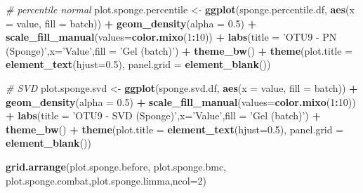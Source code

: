 \documentclass[]{book}
\newenvironment{Shaded}{\begin{snugshade}}{\end{snugshade}}
\newcommand{\KeywordTok}[1]{\textcolor[rgb]{0.13,0.29,0.53}{\textbf{#1}}}
\newcommand{\DataTypeTok}[1]{\textcolor[rgb]{0.13,0.29,0.53}{#1}}
\newcommand{\DecValTok}[1]{\textcolor[rgb]{0.00,0.00,0.81}{#1}}
\newcommand{\FloatTok}[1]{\textcolor[rgb]{0.00,0.00,0.81}{#1}}
\newcommand{\StringTok}[1]{\textcolor[rgb]{0.31,0.60,0.02}{#1}}
\newcommand{\CommentTok}[1]{\textcolor[rgb]{0.56,0.35,0.01}{\textit{#1}}}
\newcommand{\OperatorTok}[1]{\textcolor[rgb]{0.81,0.36,0.00}{\textbf{#1}}}
\newcommand{\NormalTok}[1]{#1}
\begin{document}
\begin{Shaded}
\begin{Highlighting}[]
\CommentTok{# percentile normal}
\NormalTok{plot.sponge.percentile <-}\StringTok{ }\KeywordTok{ggplot}\NormalTok{(sponge.percentile.df, }\KeywordTok{aes}\NormalTok{(}\DataTypeTok{x =}\NormalTok{ value, }\DataTypeTok{fill =}\NormalTok{ batch)) }\OperatorTok{+}\StringTok{ }\KeywordTok{geom_density}\NormalTok{(}\DataTypeTok{alpha =} \FloatTok{0.5}\NormalTok{) }\OperatorTok{+}\StringTok{ }\KeywordTok{scale_fill_manual}\NormalTok{(}\DataTypeTok{values=}\KeywordTok{color.mixo}\NormalTok{(}\DecValTok{1}\OperatorTok{:}\DecValTok{10}\NormalTok{)) }\OperatorTok{+}\StringTok{ }\KeywordTok{labs}\NormalTok{(}\DataTypeTok{title =} \StringTok{'OTU9 - PN (Sponge)'}\NormalTok{,}\DataTypeTok{x=}\StringTok{'Value'}\NormalTok{,}\DataTypeTok{fill =} \StringTok{'Gel (batch)'}\NormalTok{) }\OperatorTok{+}\StringTok{ }\KeywordTok{theme_bw}\NormalTok{() }\OperatorTok{+}\StringTok{ }\KeywordTok{theme}\NormalTok{(}\DataTypeTok{plot.title =} \KeywordTok{element_text}\NormalTok{(}\DataTypeTok{hjust=}\FloatTok{0.5}\NormalTok{), }\DataTypeTok{panel.grid =} \KeywordTok{element_blank}\NormalTok{())}


\CommentTok{# SVD}
\NormalTok{plot.sponge.svd <-}\StringTok{ }\KeywordTok{ggplot}\NormalTok{(sponge.svd.df, }\KeywordTok{aes}\NormalTok{(}\DataTypeTok{x =}\NormalTok{ value, }\DataTypeTok{fill =}\NormalTok{ batch)) }\OperatorTok{+}\StringTok{ }\KeywordTok{geom_density}\NormalTok{(}\DataTypeTok{alpha =} \FloatTok{0.5}\NormalTok{) }\OperatorTok{+}\StringTok{ }\KeywordTok{scale_fill_manual}\NormalTok{(}\DataTypeTok{values=}\KeywordTok{color.mixo}\NormalTok{(}\DecValTok{1}\OperatorTok{:}\DecValTok{10}\NormalTok{)) }\OperatorTok{+}\StringTok{ }\KeywordTok{labs}\NormalTok{(}\DataTypeTok{title =} \StringTok{'OTU9 - SVD (Sponge)'}\NormalTok{,}\DataTypeTok{x=}\StringTok{'Value'}\NormalTok{,}\DataTypeTok{fill =} \StringTok{'Gel (batch)'}\NormalTok{) }\OperatorTok{+}\StringTok{ }\KeywordTok{theme_bw}\NormalTok{() }\OperatorTok{+}\StringTok{ }\KeywordTok{theme}\NormalTok{(}\DataTypeTok{plot.title =} \KeywordTok{element_text}\NormalTok{(}\DataTypeTok{hjust=}\FloatTok{0.5}\NormalTok{), }\DataTypeTok{panel.grid =} \KeywordTok{element_blank}\NormalTok{())}
\end{Highlighting}
\end{Shaded}

\begin{Shaded}
\begin{Highlighting}[]
\KeywordTok{grid.arrange}\NormalTok{(plot.sponge.before, plot.sponge.bmc, plot.sponge.combat,plot.sponge.limma,}\DataTypeTok{ncol=}\DecValTok{2}\NormalTok{)}
\end{Highlighting}
\end{Shaded}
\end{document}
